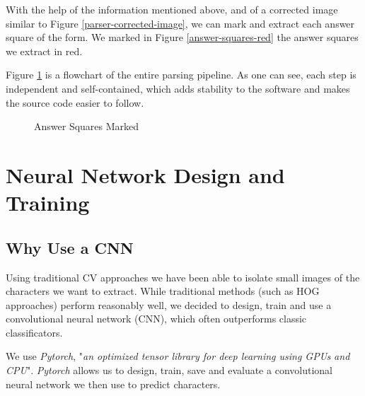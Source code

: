\documentclass[12pt, a4paper]{report}
\begin{document}
With the help of the information mentioned above, and of a corrected image similar to Figure \ref{parser-corrected-image}, we can mark and extract each answer square of the form. We marked in Figure \ref{answer-squares-red} the answer squares we extract in red.

Figure \ref{parsing-flow} is a flowchart of the entire parsing pipeline. As one can see, each step is independent and self-contained, which adds stability to the software and makes the source code easier to follow. 

\begin{figure}[!h]
	\centering
	\caption{Answer Squares Marked}
	\label{parsing-flow}
\end{figure}



\chapter{Neural Network Design and Training}

\section{Why Use a CNN}

Using traditional CV approaches we have been able to isolate small images of the characters we want to extract. While traditional methods (such as HOG\cite{HOG} approaches) perform reasonably well, we decided to design, train and use a convolutional neural network (CNN)\cite{CNN}, which often outperforms classic classificators.

We use \textit{Pytorch}, "\textit{an optimized tensor library for deep learning using GPUs and CPU}"\cite{pytorch}. \textit{Pytorch} allows us to design, train, save and evaluate a convolutional neural network we then use to predict characters.
\end{document}

